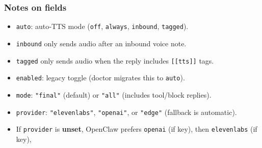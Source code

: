 \subsubsection{Notes on fields}


\begin{itemize}
  \item \texttt{auto}: auto‑TTS mode (\texttt{off}, \texttt{always}, \texttt{inbound}, \texttt{tagged}).
  \item \texttt{inbound} only sends audio after an inbound voice note.
  \item \texttt{tagged} only sends audio when the reply includes \texttt{[[tts]]} tags.
  \item \texttt{enabled}: legacy toggle (doctor migrates this to \texttt{auto}).
  \item \texttt{mode}: \texttt{"final"} (default) or \texttt{"all"} (includes tool/block replies).
  \item \texttt{provider}: \texttt{"elevenlabs"}, \texttt{"openai"}, or \texttt{"edge"} (fallback is automatic).
  \item If \texttt{provider} is \textbf{unset}, OpenClaw prefers \texttt{openai} (if key), then \texttt{elevenlabs} (if key),
\end{itemize}

